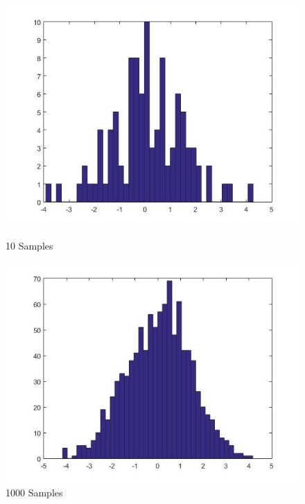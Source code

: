 \documentclass[10pt]{article}
\begin{document}
\begin{figure}[!h]
  \centering
  \begin{minipage}[b]{0.32\textwidth}
    \includegraphics[width=\textwidth]{clt100.jpg}
    \caption{10 Samples}
  \end{minipage}
  \hfill
  \begin{minipage}[b]{0.32\textwidth}
    \includegraphics[width=\textwidth]{clt1000.jpg}
    \caption{1000 Samples}
  \end{minipage}
  \begin{minipage}[b]{0.32\textwidth}

\end{minipage}
\end{figure}
\end{document}
